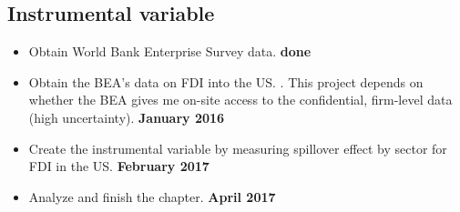 \subsection{Instrumental variable}
\begin{itemize}
\item Obtain World Bank Enterprise Survey data. \textbf{done}
\item Obtain the BEA's data on FDI into the US. . This project depends on whether the BEA gives me on-site access to the confidential, firm-level data (high uncertainty). \textbf{January 2016}
\item Create the instrumental variable by measuring spillover effect by sector for FDI in the US. \textbf{February 2017}
\item Analyze and finish the chapter. \textbf{April 2017}
\end{itemize}